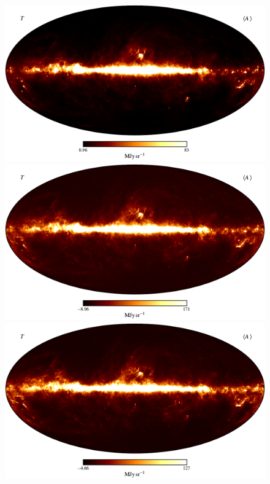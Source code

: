 \documentclass{aa}
\begin{document}
\begin{figure}
	\centering
        \includegraphics[width=0.73\linewidth]{figs/CG_DIRBE_08_n0512_DR2_I_MEAN_w18_n512_cb_c-afmhot.pdf}\\
        \includegraphics[width=0.73\linewidth]{figs/CG_DIRBE_09_n0512_DR2_I_MEAN_w18_n512_cb_c-afmhot.pdf}\\
        \includegraphics[width=0.73\linewidth]{figs/CG_DIRBE_10_n0512_DR2_I_MEAN_w18_n512_cb_c-afmhot.pdf}
	\caption{}
	\label{fig:freqmaps8_10}
\end{figure}
\end{document}
